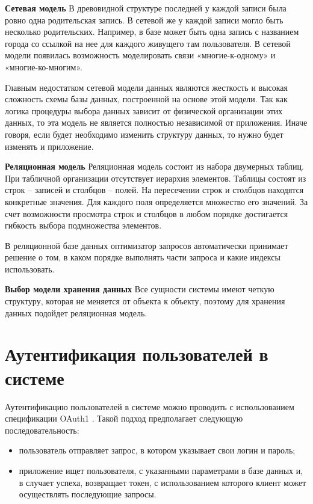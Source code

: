 \textbf{Сетевая модель}
В древовидной структуре последней у каждой записи была ровно одна родительская запись. В сетевой же у каждой записи могло быть несколько родительских. Например, в базе
может быть одна запись с названием города со ссылкой на нее
для каждого живущего там пользователя. В сетевой модели появилась возможность моделировать связи «многие-к-одному» и «многие-ко-многим».

Главным недостатком сетевой модели данных являются жесткость и высокая сложность схемы базы данных, построенной на основе этой модели. Так как логика процедуры выбора данных зависит от физической организации этих данных, то эта модель не является полностью независимой от приложения. Иначе говоря, если будет необходимо изменить структуру данных, то нужно будет изменять и приложение.

\textbf{Реляционная модель}
Реляционная модель состоит из набора двумерных таблиц. При табличной организации отсутствует иерархия элементов. Таблицы состоят из строк – записей и столбцов – полей. На пересечении строк и столбцов находятся конкретные значения. Для каждого поля определяется множество его значений. За счет возможности просмотра строк и столбцов в любом порядке достигается гибкость выбора подмножества элементов.

В реляционной базе данных оптимизатор запросов автоматически принимает решение о том, в каком порядке выполнять части запроса и какие индексы использовать.

\textbf{Выбор модели хранения данных}
Все сущности системы имеют четкую структуру, которая не меняется от объекта к объекту, поэтому для хранения данных подойдет реляционная модель.

\section{Аутентификация пользователей в системе}

Аутентификацию пользователей в системе можно проводить с использованием спецификации OAuth1 \cite{oauth1}. Такой подход предполагает следующую последовательность:
\begin{itemize}
	\item пользователь отправляет запрос, в котором указывает свои логин и пароль;
	\item приложение ищет пользователя, с указанными параметрами в базе данных и, в случает успеха, возвращает токен, с использованием которого клиент может осуществлять последующие запросы.
\end{itemize}


